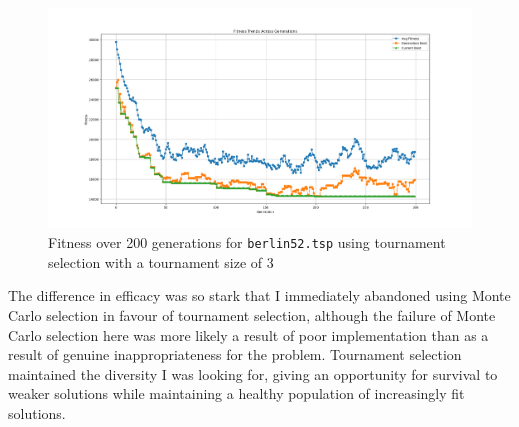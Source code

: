\documentclass[a4paper]{article}
\begin{document}
\begin{figure}[H]
    \centering
    \includegraphics[width=\textwidth]{./images/berlin_52_tourn_defaults.png}
    \caption{Fitness over 200 generations for \texttt{berlin52.tsp} using tournament selection with a tournament size of 3}
\end{figure}

The difference in efficacy was so stark that I immediately abandoned using Monte Carlo selection in favour of tournament selection, although the failure of Monte Carlo selection here was more likely a result of poor implementation than as a result of genuine inappropriateness for the problem.
Tournament selection maintained the diversity I was looking for, giving an opportunity for survival to weaker solutions while maintaining a healthy population of increasingly fit solutions.
\end{document}
